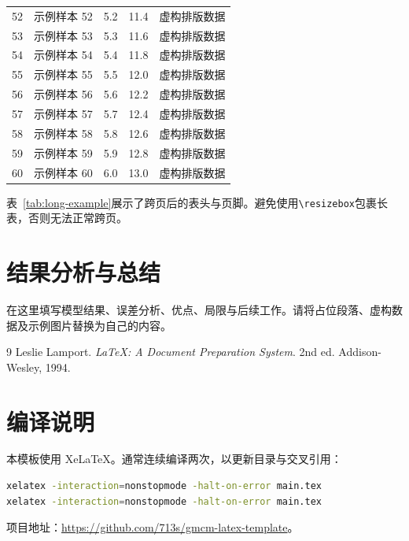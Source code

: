 \documentclass[bwprint]{gmcmthesis}
\numberwithin{figure}{section}
\numberwithin{table}{section}
\numberwithin{equation}{section}
\newcommand{\tabref}[1]{表~\ref{#1}}
\begin{document}
\begin{longtable}{@{}r p{.28\linewidth} r r p{.24\linewidth}@{}}
52 & 示例样本 52 & 5.2 & 11.4 & 虚构排版数据 \\
53 & 示例样本 53 & 5.3 & 11.6 & 虚构排版数据 \\
54 & 示例样本 54 & 5.4 & 11.8 & 虚构排版数据 \\
55 & 示例样本 55 & 5.5 & 12.0 & 虚构排版数据 \\
56 & 示例样本 56 & 5.6 & 12.2 & 虚构排版数据 \\
57 & 示例样本 57 & 5.7 & 12.4 & 虚构排版数据 \\
58 & 示例样本 58 & 5.8 & 12.6 & 虚构排版数据 \\
59 & 示例样本 59 & 5.9 & 12.8 & 虚构排版数据 \\
60 & 示例样本 60 & 6.0 & 13.0 & 虚构排版数据 \\
\end{longtable}
\endgroup
\tabref{tab:long-example}展示了跨页后的表头与页脚。避免使用\verb|\resizebox|包裹长表，否则无法正常跨页。

\section{结果分析与总结}
在这里填写模型结果、误差分析、优点、局限与后续工作。请将占位段落、虚构数据及示例图片替换为自己的内容。

\begin{thebibliography}{9}
 Leslie Lamport. \emph{LaTeX: A Document Preparation System}. 2nd ed. Addison-Wesley, 1994.
\end{thebibliography}

\appendix
\section{编译说明}
本模板使用 XeLaTeX。通常连续编译两次，以更新目录与交叉引用：
\begin{lstlisting}[language=bash]
xelatex -interaction=nonstopmode -halt-on-error main.tex
xelatex -interaction=nonstopmode -halt-on-error main.tex
\end{lstlisting}
项目地址：\url{https://github.com/713s/gmcm-latex-template}。
\end{document}
